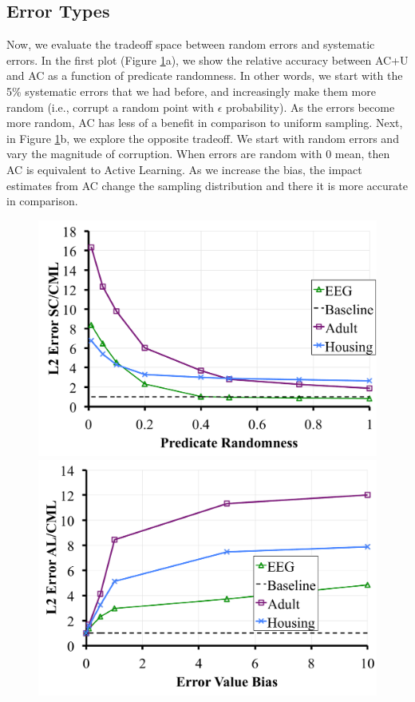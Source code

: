 \subsection{Error Types}
Now, we evaluate the tradeoff space between random errors and systematic errors.
In the first plot (Figure \ref{tradeoffs}a), we show the relative accuracy between AC+U and AC as a function of predicate randomness. 
In other words, we start with the 5\% systematic errors that we had before, and increasingly make them more random (i.e., corrupt a random point with $\epsilon$ probability).
As the errors become more random, AC has less of a benefit in comparison to uniform sampling.
Next, in Figure \ref{tradeoffs}b, we explore the opposite tradeoff. 
We start with random errors and vary the magnitude of corruption.
When errors are random with 0 mean, then AC is equivalent to Active Learning.
As we increase the bias, the impact estimates from AC change the sampling distribution and there it is more accurate in comparison.  
\begin{figure}[ht!]
\centering
 \includegraphics[scale=0.13]{exp/exp5a.pdf}
 \includegraphics[scale=0.13]{exp/exp5b.pdf}
 \caption{ \label{tradeoffs}}
\end{figure}



